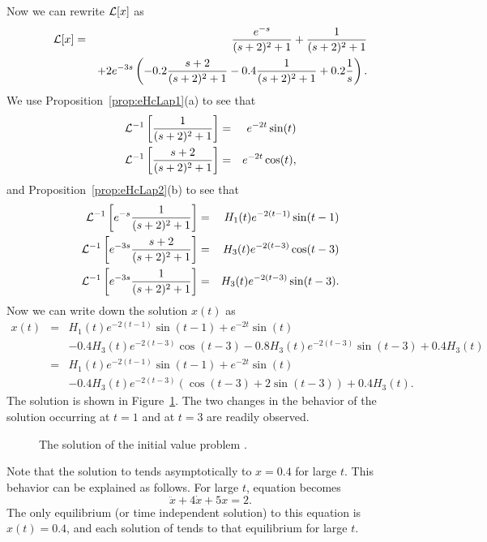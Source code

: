 \documentclass{ximera}
\begin{document}
Now we can rewrite ${\cal L}[x]$ as
\begin{eqnarray*}
{\cal L}[x] &=& \frac{e^{-s}}{(s+2)^2+1}+ \frac{1}{(s+2)^2+1}\\
&& +2e^{-3s}\left(-0.2\frac{s+2}{(s+2)^2+1}-0.4\frac{1}{(s+2)^2+1}
+0.2\frac{1}{s}\right).
\end{eqnarray*}
We use Proposition~\ref{prop:eHcLap1}(a) to see that
\begin{eqnarray*}
{\cal L}^{-1}\left[\frac{1}{(s+2)^2+1}\right]&=&
e^{-2t}\sin(t)\\
{\cal L}^{-1}\left[\frac{s+2}{(s+2)^2+1}\right]&=&
e^{-2t}\cos(t),
\end{eqnarray*}
and Proposition~\ref{prop:eHcLap2}(b) to see that
\begin{eqnarray*}
{\cal L}^{-1}\left[e^{-s}\frac{1}{(s+2)^2+1}\right]&=&
H_1(t)e^{-2(t-1)}\sin(t-1)\\
{\cal L}^{-1}\left[e^{-3s}\frac{s+2}{(s+2)^2+1}\right]&=&
H_3(t)e^{-2(t-3)}\cos(t-3)\\
{\cal L}^{-1}\left[e^{-3s}\frac{1}{(s+2)^2+1}\right]&=&
H_3(t)e^{-2(t-3)}\sin(t-3).
\end{eqnarray*}
Now we can write down the solution $x(t)$ as
\begin{eqnarray*}
x(t) &=& H_1(t)e^{-2(t-1)}\sin(t-1)+e^{-2t}\sin(t)\\
&&-0.4 H_3(t)e^{-2(t-3)}\cos(t-3) -0.8 H_3(t)e^{-2(t-3)}\sin(t-3)
+0.4 H_3(t)\\
&=& H_1(t)e^{-2(t-1)}\sin(t-1)+e^{-2t}\sin(t)\\
&& -0.4 H_3(t)e^{-2(t-3)}(\cos(t-3)+2\sin(t-3))+0.4 H_3(t).
\end{eqnarray*}
The solution is shown in Figure~\ref{fig:lapallsol}.
The two changes in the behavior of the solution occurring at 
$t=1$ and at $t=3$ are readily observed.  
\begin{figure}[htb]
           \centerline{%
           }
           \caption{The solution of the initial value problem
           \protect{}.}
           \label{fig:lapallsol}
\end{figure}

Note that the solution to  tends asymptotically to 
$x=0.4$  for large $t$.  This behavior can be explained as follows.  For large 
$t$, equation  becomes
\[
\ddot x + 4\dot x +5x = 2.
\]
The only equilibrium (or time independent solution) to this equation is
$x(t)=0.4$, and each solution of  tends to that equilibrium 
for large $t$.
\end{document}
